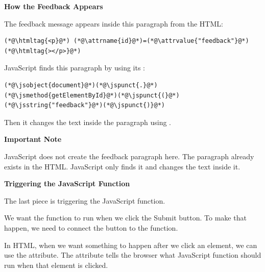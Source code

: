 \documentclass{article}
\begin{document}
\textbf{\Bitter\textcolor{naranja}{How the Feedback Appears}}

\vspace{0.1cm}

The feedback message appears inside this paragraph from the HTML:

\vspace{0.1cm}

\begin{lstlisting}
(*@\htmltag{<p}@*) (*@\attrname{id}@*)=(*@\attrvalue{"feedback"}@*)(*@\htmltag{></p>}@*)
\end{lstlisting}

\vspace{0.2cm}

JavaScript finds this paragraph by using its :

\vspace{0.1cm}

\begin{lstlisting}
(*@\jsobject{document}@*)(*@\jspunct{.}@*)(*@\jsmethod{getElementById}@*)(*@\jspunct{(}@*)(*@\jsstring{"feedback"}@*)(*@\jspunct{)}@*)
\end{lstlisting}

\vspace{0.2cm}

Then it changes the text inside the paragraph using .

\vspace{0.3cm}

\begin{attentionbox}
  \textbf{\Bitter\textcolor{naranja}{Important Note}}

  JavaScript does not create the feedback paragraph here.
  The paragraph already exists in the HTML.
  JavaScript only finds it and changes the text inside it.
\end{attentionbox}

\vspace{0.4cm}

\textbf{\Bitter\textcolor{naranja}{Triggering the JavaScript Function}}

\vspace{0.1cm}

The last piece is triggering the JavaScript function.

We want the  function to run when we click the Submit button.
To make that happen, we need to connect the button to the function.

In HTML, when we want something to happen after we click an element, we can use the  attribute.
The  attribute tells the browser what JavaScript function should run when that element is clicked.
\end{document}
